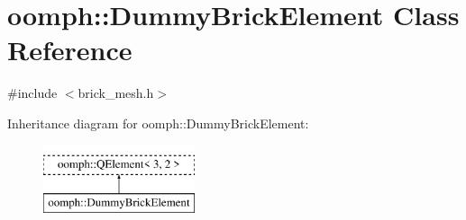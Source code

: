 \hypertarget{classoomph_1_1DummyBrickElement}{}\section{oomph\+:\+:Dummy\+Brick\+Element Class Reference}
\label{classoomph_1_1DummyBrickElement}


{\ttfamily \#include $<$brick\+\_\+mesh.\+h$>$}

Inheritance diagram for oomph\+:\+:Dummy\+Brick\+Element\+:\begin{figure}[H]
\begin{center}
\leavevmode
\includegraphics[height=2.000000cm]{classoomph_1_1DummyBrickElement}
\end{center}
\end{figure}
